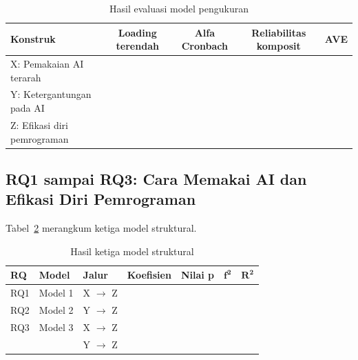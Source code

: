 \begin{table}[H]
  \centering
  \caption{Hasil evaluasi model pengukuran}
  \label{tab:b16-ukur}
  \begin{tabularx}{\textwidth}{Xcccc}
    \hline
    \textbf{Konstruk} & \textbf{Loading terendah} & \textbf{Alfa Cronbach} & \textbf{Reliabilitas komposit} & \textbf{AVE} \\
    \hline
    X: Pemakaian AI terarah & \isian{\ldots} & \isian{\ldots} & \isian{\ldots} & \isian{\ldots} \\
    \hline
    Y: Ketergantungan pada AI & \isian{\ldots} & \isian{\ldots} & \isian{\ldots} & \isian{\ldots} \\
    \hline
    Z: Efikasi diri pemrograman & \isian{\ldots} & \isian{\ldots} & \isian{\ldots} & \isian{\ldots} \\
    \hline
  \end{tabularx}
\end{table}

\subsection{RQ1 sampai RQ3: Cara Memakai AI dan Efikasi Diri Pemrograman}

Tabel~\ref{tab:b16-struktural} merangkum ketiga model struktural. 

\begin{table}[H]
  \centering
  \caption{Hasil ketiga model struktural}
  \label{tab:b16-struktural}
  \begin{tabularx}{\textwidth}{llXcccc}
    \hline
    \textbf{RQ} & \textbf{Model} & \textbf{Jalur} & \textbf{Koefisien} & \textbf{Nilai p} & $\boldsymbol{f^2}$ & $\boldsymbol{R^2}$ \\
    \hline
    RQ1 & Model 1 & X $\rightarrow$ Z & \isian{\ldots} & \isian{\ldots} & \isian{\ldots} & \isian{\ldots} \\
    \hline
    RQ2 & Model 2 & Y $\rightarrow$ Z & \isian{\ldots} & \isian{\ldots} & \isian{\ldots} & \isian{\ldots} \\
    \hline
    RQ3 & Model 3 & X $\rightarrow$ Z & \isian{\ldots} & \isian{\ldots} & \isian{\ldots} & \isian{\ldots} \\
    \hline
    & & Y $\rightarrow$ Z & \isian{\ldots} & \isian{\ldots} & \isian{\ldots} & \\
    \hline
  \end{tabularx}
\end{table}

